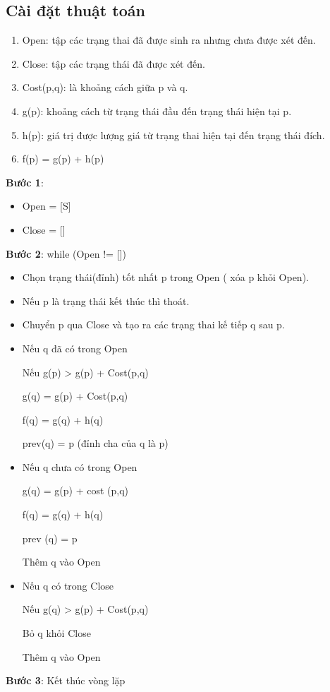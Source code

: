 \documentclass{article}
\begin{document}
\subsection{Cài đặt thuật toán}
\begin{enumerate}
    \item Open: tập các trạng thai đã được sinh ra nhưng chưa được xét đến.
    \item Close: tập các trạng thái đã được xét đến.
    \item Cost(p,q): là khoảng cách giữa p và q.
    \item g(p): khoảng cách từ trạng thái đầu đến trạng thái hiện tại p.
    \item h(p): giá trị được lượng giá từ trạng thai hiện tại đến trạng thái đích.
    \item f(p) = g(p) + h(p)

\end{enumerate}
\textbf{Bước 1}:
\begin{itemize}
    \item Open = [S]
    \item Close = []

\end{itemize}
 \textbf{Bước 2}: while (Open != [])
    \begin{itemize}
        \item Chọn trạng thái(đỉnh) tốt nhất p trong Open ( xóa p khỏi Open).
        \item Nếu p là trạng thái kết thúc thì thoát.
        \item Chuyển p qua Close và tạo ra các trạng thai kế tiếp q sau p.
        \item Nếu q đã có trong Open
        
         Nếu g(p) > g(p) + Cost(p,q)
         
            g(q) = g(p) + Cost(p,q)
            
            f(q) = g(q) + h(q)
            
            prev(q) = p (đỉnh cha của q là p)
        \item Nếu q chưa có trong Open
        
                g(q) = g(p) + cost (p,q)

                f(q) = g(q) + h(q)

                prev (q) = p

                Thêm q vào Open				

        \item Nếu q có trong Close 

                Nếu g(q) > g(p) + Cost(p,q)

                Bỏ q khỏi Close

                Thêm q vào Open


    \end{itemize}
\textbf{Bước 3}: Kết thúc vòng lặp
\end{document}
